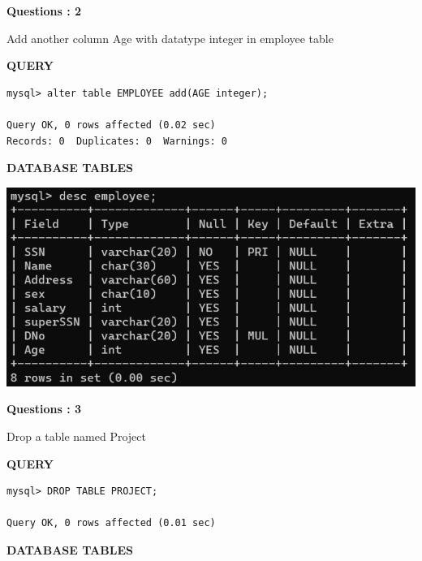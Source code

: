 \documentclass[a4paper,12pt]{report}
\begin{document}

\begin{flushleft}
    \textbf{Questions : 2}
\end{flushleft}
Add another column Age with datatype integer in employee table
\begin{flushleft}
		\textbf{QUERY }
	\end{flushleft}
\begin{verbatim}
mysql> alter table EMPLOYEE add(AGE integer);

Query OK, 0 rows affected (0.02 sec)
Records: 0  Duplicates: 0  Warnings: 0

\end{verbatim}

\begin{flushleft}
		\textbf{DATABASE TABLES}
\end{flushleft} 

\includegraphics[scale=0.7]{ALTER_ADD.png}
\begin{flushleft}
    \textbf{Questions : 3}
\end{flushleft}
Drop a table named Project
\begin{flushleft}
		\textbf{QUERY }
	\end{flushleft}
\begin{verbatim}
mysql> DROP TABLE PROJECT;

Query OK, 0 rows affected (0.01 sec)

\end{verbatim}

\begin{flushleft}
		\textbf{DATABASE TABLES}
\end{flushleft} 
\end{document}
